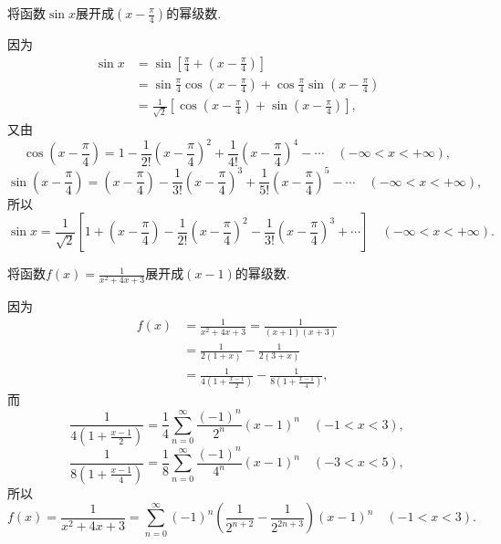 \begin{example}
将函数\(\sin x\)展开成\(\left(x-\frac{\pi}{4}\right)\)的幂级数.
\begin{solution}
因为\[
\begin{split}
\sin x &= \sin\left[\frac{\pi}{4}+\left(x-\frac{\pi}{4}\right)\right] \\
&= \sin\frac{\pi}{4} \cos\left(x-\frac{\pi}{4}\right) + \cos\frac{\pi}{4} \sin\left(x-\frac{\pi}{4}\right) \\
&= \frac{1}{\sqrt{2}} \left[\cos\left(x-\frac{\pi}{4}\right) + \sin\left(x-\frac{\pi}{4}\right)\right],
\end{split}
\]又由\[
\cos\left(x-\frac{\pi}{4}\right)
= 1 - \frac{1}{2!} \left(x-\frac{\pi}{4}\right)^2 + \frac{1}{4!} \left(x-\frac{\pi}{4}\right)^4 - \dotsb
\quad (-\infty < x < +\infty),
\]\[
\sin\left(x-\frac{\pi}{4}\right)
= \left(x-\frac{\pi}{4}\right) - \frac{1}{3!} \left(x-\frac{\pi}{4}\right)^3 + \frac{1}{5!} \left(x-\frac{\pi}{4}\right)^5 - \dotsb
\quad (-\infty < x < +\infty),
\]所以\[
\sin x = \frac{1}{\sqrt{2}} \left[
1 + \left(x-\frac{\pi}{4}\right)
- \frac{1}{2!} \left(x-\frac{\pi}{4}\right)^2
- \frac{1}{3!} \left(x-\frac{\pi}{4}\right)^3
+ \dotsb
\right]
\quad (-\infty < x < +\infty).
\]
\end{solution}
\end{example}

\begin{example}
将函数\(f(x) = \frac{1}{x^2+4x+3}\)展开成\((x-1)\)的幂级数.
\begin{solution}
因为\[
\begin{split}
f(x) &= \frac{1}{x^2+4x+3}
= \frac{1}{(x+1)(x+3)} \\
&= \frac{1}{2(1+x)} - \frac{1}{2(3+x)} \\
&= \frac{1}{4\left(1+\frac{x-1}{2}\right)}
- \frac{1}{8\left(1+\frac{x-1}{4}\right)},
\end{split}
\]而\[
\frac{1}{4\left(1+\frac{x-1}{2}\right)}
= \frac{1}{4} \sum\limits_{n=0}^{\infty} \frac{(-1)^n}{2^n} (x-1)^n
\quad (-1<x<3),
\]\[
\frac{1}{8\left(1+\frac{x-1}{4}\right)}
= \frac{1}{8} \sum\limits_{n=0}^{\infty} \frac{(-1)^n}{4^n} (x-1)^n
\quad (-3<x<5),
\]所以\[
f(x) = \frac{1}{x^2+4x+3}
= \sum\limits_{n=0}^{\infty} (-1)^n \left(\frac{1}{2^{n+2}}-\frac{1}{2^{2n+3}}\right) (x-1)^n
\quad (-1<x<3).
\]
\end{solution}
\end{example}

